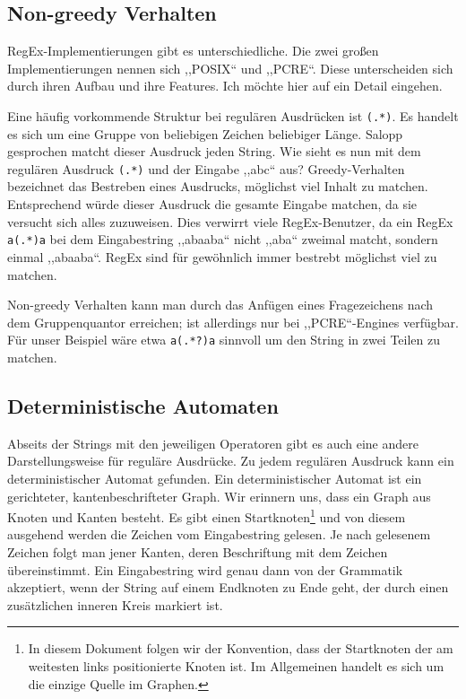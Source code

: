 \subsection{Non-greedy Verhalten}
%
RegEx-Implementierungen gibt es unterschiedliche. Die zwei großen Implementierungen nennen sich ,,POSIX`` und ,,PCRE``. Diese unterscheiden sich durch ihren Aufbau und ihre Features. Ich möchte hier auf ein Detail eingehen.

Eine häufig vorkommende Struktur bei regulären Ausdrücken ist \texttt{(.*)}. Es handelt es sich um eine Gruppe von beliebigen Zeichen beliebiger Länge. Salopp gesprochen matcht dieser Ausdruck jeden String.
Wie sieht es nun mit dem regulären Ausdruck \texttt{(.*)} und der Eingabe ,,abc`` aus? Greedy-Verhalten bezeichnet das Bestreben eines Ausdrucks, möglichst viel Inhalt zu matchen. Entsprechend würde dieser Ausdruck die gesamte Eingabe matchen, da sie versucht sich alles zuzuweisen. Dies verwirrt viele RegEx-Benutzer, da ein RegEx \texttt{a(.*)a} bei dem Eingabestring ,,abaaba`` nicht ,,aba`` zweimal matcht, sondern einmal ,,abaaba``. RegEx sind für gewöhnlich immer bestrebt möglichst viel zu matchen.

Non-greedy Verhalten kann man durch das Anfügen eines Fragezeichens nach dem Gruppenquantor erreichen; ist allerdings nur bei ,,PCRE``-Engines verfügbar. Für unser Beispiel wäre etwa \texttt{a(.*?)a} sinnvoll um den String in zwei Teilen zu matchen.

\subsection{Deterministische Automaten}
%
Abseits der Strings mit den jeweiligen Operatoren gibt es auch eine andere Darstellungsweise für reguläre Ausdrücke. Zu jedem regulären Ausdruck kann ein deterministischer Automat gefunden. Ein deterministischer Automat ist ein gerichteter, kantenbeschrifteter Graph. Wir erinnern uns, dass ein Graph aus Knoten und Kanten besteht. Es gibt einen Startknoten\footnote{In diesem Dokument folgen wir der Konvention, dass der Startknoten der am weitesten links positionierte Knoten ist. Im Allgemeinen handelt es sich um die einzige Quelle im Graphen.} und von diesem ausgehend werden die Zeichen vom Eingabestring gelesen. Je nach gelesenem Zeichen folgt man jener Kanten, deren Beschriftung mit dem Zeichen übereinstimmt. Ein Eingabestring wird genau dann von der Grammatik akzeptiert, wenn der String auf einem Endknoten zu Ende geht, der durch einen zusätzlichen inneren Kreis markiert ist.

